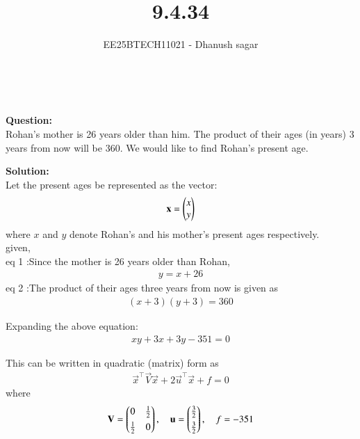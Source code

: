 \documentclass[journal]{IEEEtran}
\begin{document}


\title{9.4.34}
\author{EE25BTECH11021 - Dhanush sagar}
\maketitle \vspace{-1cm}
\renewcommand{\thefigure}{\theenumi}
\renewcommand{\thetable}{\theenumi}
\setlength{\intextsep}{10pt} %

\
\renewcommand{\thetable}{\theenumi}

\textbf{Question:}  \\
Rohan's mother is 26 years older than him. The product of their ages (in years) 3 years from now will be 360. We would like to find Rohan's present age.

\textbf{Solution:}  \\
Let the present ages be represented as the vector:
\begin{align}
\mathbf{x} = \begin{pmatrix}x \\ y\end{pmatrix}
\end{align}
where $x$ and $y$ denote Rohan's and his mother's present ages respectively.\\

given,\\
eq 1 :Since the mother is 26 years older than Rohan,
\begin{align}
y = x + 26
\end{align}
eq 2 :The product of their ages three years from now is given as
\begin{align}
(x+3)(y+3) = 360
\end{align}

Expanding the above equation:
\begin{align}
xy + 3x + 3y - 351 = 0
\end{align}

This can be written in quadratic (matrix) form as
\begin{align}
\vec{x}^\top \vec{V} \vec{x} + 2\vec{u}^\top \vec{x} + f = 0
\end{align}
where
\begin{align}
\mathbf{V} = \begin{pmatrix}0 & \tfrac{1}{2} \\[4pt] \tfrac{1}{2} & 0\end{pmatrix}, \quad
\mathbf{u} = \begin{pmatrix}\tfrac{3}{2} \\[4pt] \tfrac{3}{2}\end{pmatrix}, \quad
f = -351
\end{align}
\end{document}
